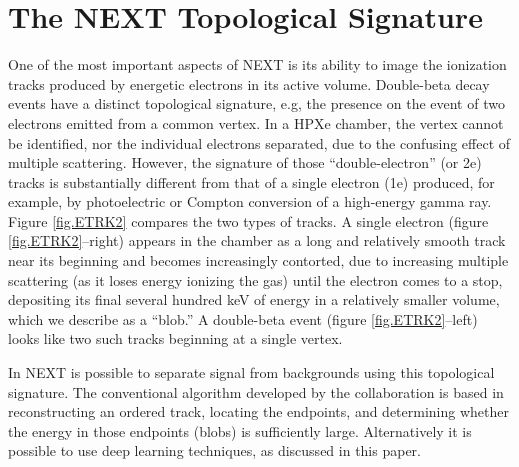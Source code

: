 \documentclass[a4paper,11pt]{article}
\begin{document}
\section{The NEXT Topological Signature}\label{sec:topology}
One of the most important aspects of NEXT is its ability to image the ionization tracks produced by energetic electrons in its active volume.  Double-beta decay events have a distinct
topological signature, e.g, the presence on the event of two electrons emitted from a common vertex. In a HPXe chamber, the vertex cannot be identified, nor the individual electrons separated, due to the confusing effect of multiple scattering. However, the signature of those ``double-electron'' (or 2e) tracks is substantially different from that of a single electron (1e) produced, for example, by photoelectric or Compton 
conversion of a high-energy gamma ray.  Figure \ref{fig.ETRK2} compares the two types of
tracks. A single electron (figure  \ref{fig.ETRK2}--right) appears in the chamber as a long and relatively smooth track near its beginning and becomes increasingly contorted, due to increasing multiple scattering (as it loses energy ionizing the gas) until the electron comes to a stop, depositing
its final several hundred keV of energy in a relatively smaller volume, which we describe as a ``blob.'' 
A double-beta event (figure  \ref{fig.ETRK2}--left)  looks like two such tracks beginning at a single vertex.  

In NEXT is possible to separate signal from backgrounds using this topological signature. The conventional algorithm developed by the collaboration is based in reconstructing an ordered
track, locating the endpoints, and determining whether the energy in those endpoints (blobs) is sufficiently large. Alternatively it is possible to use deep learning techniques, as discussed in this paper.   
\end{document}
